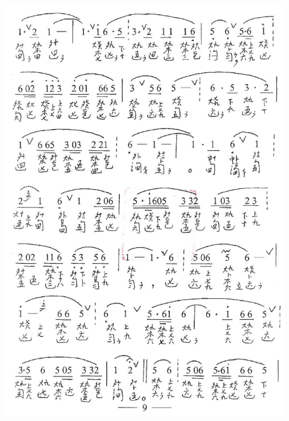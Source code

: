 \documentclass[cn,pad,twocol]{elegantbook}
\begin{document}
\paragraph*{\includegraphics[width=0.95\textwidth]{mudanting/2021-牡丹亭-09寻梦}} 
\end{document}
